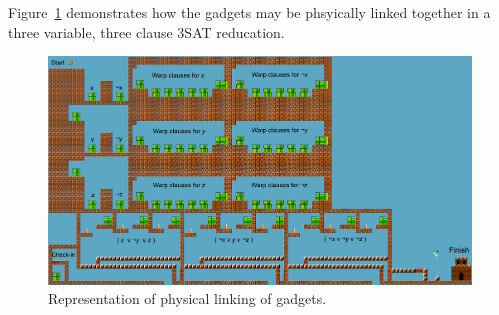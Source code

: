 \documentclass[11pt, a4paper, oneside]{report} %
\begin{document}






Figure~\ref{full-level} demonstrates how the gadgets may be phsyically linked
together in a three variable, three clause 3SAT reducation.

\begin{figure}[ht!]

  \centering
    \includegraphics[scale=0.26]{basic_level}
  \caption{Representation of physical linking of gadgets.}
  \label{full-level}
\end{figure}
\end{document}
